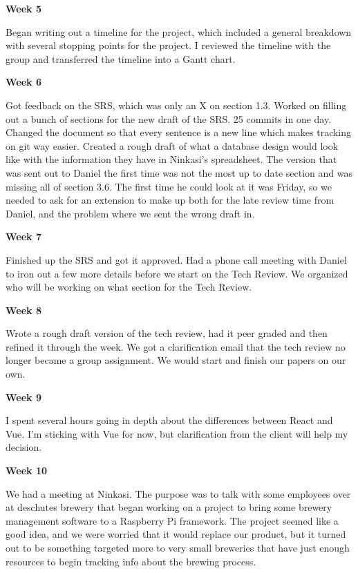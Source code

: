 \noindent\medskip\textbf{Week 5}

Began writing out a timeline for the project, which included a general breakdown with several stopping points for the project.
I reviewed the timeline with the group and transferred the timeline into a Gantt chart.

\noindent\medskip\textbf{Week 6}

Got feedback on the SRS, which was only an X on section 1.3.
Worked on filling out a bunch of sections for the new draft of the SRS. 25 commits in one day.
Changed the document so that every sentence is a new line which makes tracking on git way easier.
Created a rough draft of what a database design would look like with the information they have in Ninkasi's spreadsheet.
The version that was sent out to Daniel the first time was not the most up to date section and was missing all of section 3.6.
The first time he could look at it was Friday, so we needed to ask for an extension to make up both for the late review time from Daniel, and the problem where we sent the wrong draft in.

\noindent\medskip\textbf{Week 7}

Finished up the SRS and got it approved.
Had a phone call meeting with Daniel to iron out a few more details before we start on the Tech Review.
We organized who will be working on what section for the Tech Review.

\noindent\medskip\textbf{Week 8}

Wrote a rough draft version of the tech review, had it peer graded and then refined it through the week.
We got a clarification email that the tech review no longer became a group assignment.
We would start and finish our papers on our own.

\noindent\medskip\textbf{Week 9}

I spent several hours going in depth about the differences between React and Vue.
I'm sticking with Vue for now, but clarification from the client will help my decision.

\noindent\medskip\textbf{Week 10}

We had a meeting at Ninkasi.
The purpose was to talk with some employees over at deschutes brewery that began working on a project to bring some brewery management software to a Raspberry Pi framework.
The project seemed like a good idea, and we were worried that it would replace our product, but it turned out to be something targeted more to very small breweries that have just enough resources to begin tracking info about the brewing process.


